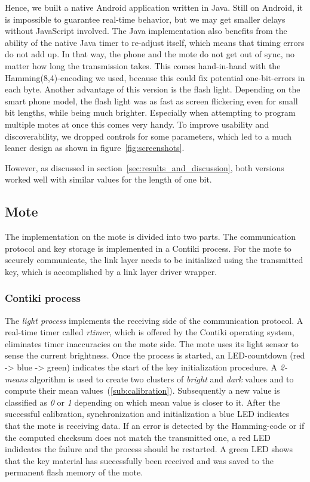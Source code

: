\documentclass{sig-alternate} %
\begin{document}
Hence, we built a native Android application written in Java.
Still on Android, it is impossible to guarantee real-time behavior, but we may get smaller delays without JavaScript involved.
The Java implementation also benefits from the ability of the native Java timer to re-adjust itself, which means that timing errors do not add up.
In that way, the phone and the mote do not get out of sync, no matter how long the transmission takes.
This comes hand-in-hand with the Hamming(8,4)-encoding we used, because this could fix potential one-bit-errors in each byte.
Another advantage of this version is the flash light.
Depending on the smart phone model, the flash light was as fast as screen flickering even for small bit lengths, while being much brighter.
Especially when attempting to program multiple motes at once this comes very handy.
To improve usability and discoverability, we dropped controls for some parameters, which led to a much leaner design as shown in figure~\ref{fig:screenshots}.

However, as discussed in section~\ref{sec:results_and_discussion}, both versions worked well with similar values for the length of one bit.

\subsection{Mote}
\label{sub:mote}

The implementation on the mote is divided into two parts.
The communication protocol and key storage is implemented in a Contiki process.
For the mote to securely communicate, the link layer needs to be initialized using the transmitted key, which is accomplished by a link layer driver wrapper.

\subsubsection{Contiki process}
\label{ssub:contiki_process}

The \textit{light process} implements the receiving side of the communication protocol.
A real-time timer called \textit{rtimer}, which is offered by the Contiki operating system, eliminates timer inaccuracies on the mote side.
The mote uses its light sensor to sense the current brightness.
Once the process is started, an LED-countdown (red -> blue -> green) indicates the start of the key initialization procedure.
A \mbox{\textit{2-means}} algorithm is used to create two clusters of \textit{bright} and \textit{dark} values and to compute their mean values~(\ref{sub:calibration}).
Subsequently a new value is classified as \textit{0} or \textit{1} depending on which mean value is closer to it.
After the successful calibration, synchronization and initialization a blue LED indicates that the mote is receiving data.
If an error is detected by the Hamming-code or if the computed checksum does not match the transmitted one, a red LED indidcates the failure and the process should be restarted.
A green LED shows that the key material has successfully been received and was saved to the permanent flash memory of the mote.
\end{document}
